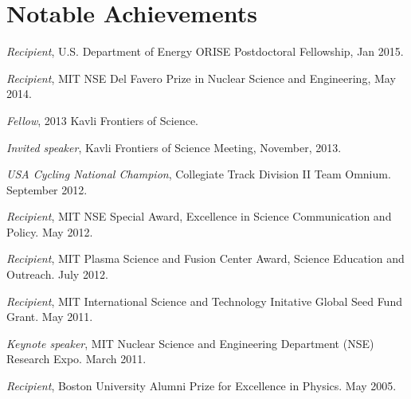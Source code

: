 \documentclass[10pt]{article}
\begin{document}
\section{Notable Achievements}
\begin{innerlist}
\item \textit{Recipient}, U.S. Department of Energy ORISE Postdoctoral Fellowship, Jan 2015.
\item \textit{Recipient}, MIT NSE Del Favero Prize in Nuclear Science and Engineering, May 2014.
\item \textit{Fellow}, 2013 Kavli Frontiers of Science.
\item \textit{Invited speaker}, Kavli Frontiers of Science Meeting, November, 2013.
\item \textit{USA Cycling National Champion}, Collegiate Track Division II Team Omnium. September 2012.
\item \textit{Recipient}, MIT NSE Special Award, Excellence in Science Communication and Policy. May 2012.
\item \textit{Recipient}, MIT Plasma Science and Fusion Center Award, Science Education and Outreach. July 2012.
\item \textit{Recipient}, MIT International Science and Technology Initative Global Seed Fund Grant. May 2011.
\item \textit{Keynote speaker}, MIT Nuclear Science and Engineering Department (NSE) Research Expo. March 2011.
\item \textit{Recipient}, Boston University Alumni Prize for Excellence in Physics. May 2005.
\end{innerlist}
\end{document}
